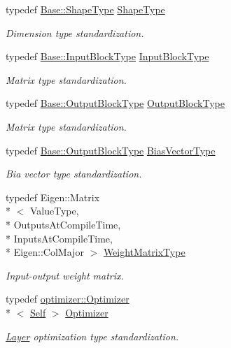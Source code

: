 \begin{DoxyCompactItemize}
typedef \hyperlink{classffnn_1_1layer_1_1_hidden_abdfcf81b3846fae3b19a207424695df0}{Base\-::\-Shape\-Type} \hyperlink{classffnn_1_1layer_1_1_fully_connected_a938c80efb16baa531fb424626f339333}{Shape\-Type}
\begin{DoxyCompactList}\small\item\em Dimension type standardization. \end{DoxyCompactList}\item 
typedef \hyperlink{classffnn_1_1layer_1_1_hidden_ae401b1af7763caf09a0dffcaf4f2d5e9}{Base\-::\-Input\-Block\-Type} \hyperlink{classffnn_1_1layer_1_1_fully_connected_a1360eaafde26c8b36ddb6fe4095b6119}{Input\-Block\-Type}
\begin{DoxyCompactList}\small\item\em Matrix type standardization. \end{DoxyCompactList}\item 
typedef \hyperlink{classffnn_1_1layer_1_1_hidden_a9b9e276188ef490ea5301f553225c735}{Base\-::\-Output\-Block\-Type} \hyperlink{classffnn_1_1layer_1_1_fully_connected_a23903ba58825efec173f318ffdc3b998}{Output\-Block\-Type}
\begin{DoxyCompactList}\small\item\em Matrix type standardization. \end{DoxyCompactList}\item 
typedef \hyperlink{classffnn_1_1layer_1_1_hidden_a9b9e276188ef490ea5301f553225c735}{Base\-::\-Output\-Block\-Type} \hyperlink{classffnn_1_1layer_1_1_fully_connected_afd08719c4360bd1447d1108396b07e57}{Bias\-Vector\-Type}
\begin{DoxyCompactList}\small\item\em Bia vector type standardization. \end{DoxyCompactList}\item 
typedef Eigen\-::\-Matrix\\*
$<$ Value\-Type, \\*
Outputs\-At\-Compile\-Time, \\*
Inputs\-At\-Compile\-Time, \\*
Eigen\-::\-Col\-Major $>$ \hyperlink{classffnn_1_1layer_1_1_fully_connected_aef17d91a349bf83f5e5a20462ebb3c81}{Weight\-Matrix\-Type}
\begin{DoxyCompactList}\small\item\em Input-\/output weight matrix. \end{DoxyCompactList}\item 
typedef \hyperlink{classffnn_1_1optimizer_1_1_optimizer}{optimizer\-::\-Optimizer}\\*
$<$ \hyperlink{classffnn_1_1layer_1_1_fully_connected_ac41b1867a1a4e8c9c9eaa892db2ab805}{Self} $>$ \hyperlink{classffnn_1_1layer_1_1_fully_connected_abae398e6ffb06d183654e5ff11857a03}{Optimizer}
\begin{DoxyCompactList}\small\item\em \hyperlink{classffnn_1_1layer_1_1_layer}{Layer} optimization type standardization. \end{DoxyCompactList}\end{DoxyCompactItemize}
